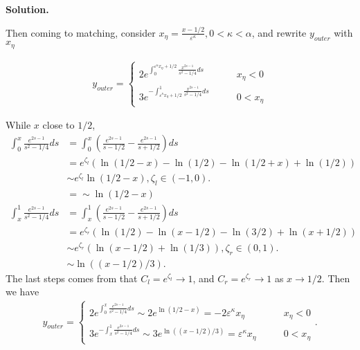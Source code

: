 \documentclass[a4paper]{book}
\newenvironment{solution}%
{\noindent\textbf{Solution.}}%
{\qedhere}
\numberwithin{equation}{chapter}
\theoremstyle{definition}
\begin{document}
\begin{solution}
  
  Then coming to matching, consider $x_{\eta} = \frac{x - 1/2}{\varepsilon^\kappa}, 0<\kappa<\alpha$, and rewrite $y_{outer}$ with $x_{\eta}$
  \begin{large}
    \begin{align*}
      y_{outer} =
      \begin{cases}
        2 e^{\int_0^{\varepsilon^\kappa x_{\eta} + 1/2} \frac{x^{2s-1}}{s^2 - 1/4}ds} &\qquad x_\eta < 0 \\
        3 e^{-\int^1_{\varepsilon^\kappa x_{\eta} + 1/2} \frac{x^{2s-1}}{s^2 - 1/4}ds} &\qquad 0 < x_\eta 
      \end{cases}
    \end{align*}
  \end{large}
  While $x$ close to $1/2$,
  \begin{align*}
    \int_0^x \frac{e^{2s-1}}{s^2 - 1/4}ds &= \int_0^x(\frac{e^{2s-1}}{s - 1/2} - \frac{e^{2s-1}}{s + 1/2})ds\\
                                          &= e^{\zeta_l} (\ln(1/2 - x) - \ln (1/2) - \ln(1/2 + x) + \ln(1/2) ) \\
                                          &\sim e^{\zeta_l} \ln(1/2 - x), \zeta_l \in (-1, 0). \\
                                          &= \sim \ln(1/2 - x) \\
    \int_x^1 \frac{e^{2s-1}}{s^2 - 1/4}ds &= \int_x^1(\frac{e^{2s-1}}{s - 1/2} - \frac{e^{2s-1}}{s + 1/2})ds\\
                                          &= e^{\zeta_r} (\ln(1/2) - \ln (x - 1/2) - \ln(3/2) + \ln(x + 1/2) ) \\
                                          &\sim e^{\zeta_r} (\ln(x - 1/2) + \ln(1/3)), \zeta_r \in (0,1). \\
                                          &\sim \ln((x - 1/2)/3).                                      
  \end{align*}
  The last steps comes from that $C_l = e^{\zeta_l} \rightarrow 1$, and $C_r = e^{\zeta_r} \rightarrow 1$ as $x \rightarrow 1/2$. Then we have
  \begin{align*}
    y_{outer} =
    \begin{cases}
      2e^{\int_0^x \frac{e^{2s-1}}{s^2 - 1/4}ds}\sim 2e^{\ln(1/2 - x)} = -2\varepsilon^\kappa x_\eta &\qquad x_\eta < 0 \\
      3e^{-\int_x^1 \frac{e^{2s-1}}{s^2 - 1/4}ds} \sim 3 e^{\ln((x - 1/2)/3)} =  \varepsilon^\kappa x_\eta &\qquad 0 < x_\eta 
    \end{cases}.

\end{align*}
\end{solution}
\end{document}
